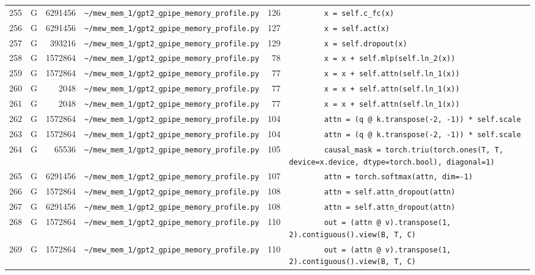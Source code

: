\documentclass{article}
\begin{document}
\begin{longtable}{r l r p{6.5cm} r p{7.0cm}}
255 & G & 6291456 & \lstinline|~/mew_mem_1/gpt2_gpipe_memory_profile.py| & 126 & \lstinline|        x = self.c_fc(x)| \\
256 & G & 6291456 & \lstinline|~/mew_mem_1/gpt2_gpipe_memory_profile.py| & 127 & \lstinline|        x = self.act(x)| \\
257 & G & 393216 & \lstinline|~/mew_mem_1/gpt2_gpipe_memory_profile.py| & 129 & \lstinline|        x = self.dropout(x)| \\
258 & G & 1572864 & \lstinline|~/mew_mem_1/gpt2_gpipe_memory_profile.py| & 78 & \lstinline|        x = x + self.mlp(self.ln_2(x))| \\
259 & G & 1572864 & \lstinline|~/mew_mem_1/gpt2_gpipe_memory_profile.py| & 77 & \lstinline|        x = x + self.attn(self.ln_1(x))| \\
260 & G & 2048 & \lstinline|~/mew_mem_1/gpt2_gpipe_memory_profile.py| & 77 & \lstinline|        x = x + self.attn(self.ln_1(x))| \\
261 & G & 2048 & \lstinline|~/mew_mem_1/gpt2_gpipe_memory_profile.py| & 77 & \lstinline|        x = x + self.attn(self.ln_1(x))| \\
262 & G & 1572864 & \lstinline|~/mew_mem_1/gpt2_gpipe_memory_profile.py| & 104 & \lstinline|        attn = (q @ k.transpose(-2, -1)) * self.scale| \\
263 & G & 1572864 & \lstinline|~/mew_mem_1/gpt2_gpipe_memory_profile.py| & 104 & \lstinline|        attn = (q @ k.transpose(-2, -1)) * self.scale| \\
264 & G & 65536 & \lstinline|~/mew_mem_1/gpt2_gpipe_memory_profile.py| & 105 & \lstinline|        causal_mask = torch.triu(torch.ones(T, T, device=x.device, dtype=torch.bool), diagonal=1)| \\
265 & G & 6291456 & \lstinline|~/mew_mem_1/gpt2_gpipe_memory_profile.py| & 107 & \lstinline|        attn = torch.softmax(attn, dim=-1)| \\
266 & G & 1572864 & \lstinline|~/mew_mem_1/gpt2_gpipe_memory_profile.py| & 108 & \lstinline|        attn = self.attn_dropout(attn)| \\
267 & G & 6291456 & \lstinline|~/mew_mem_1/gpt2_gpipe_memory_profile.py| & 108 & \lstinline|        attn = self.attn_dropout(attn)| \\
268 & G & 1572864 & \lstinline|~/mew_mem_1/gpt2_gpipe_memory_profile.py| & 110 & \lstinline|        out = (attn @ v).transpose(1, 2).contiguous().view(B, T, C)| \\
269 & G & 1572864 & \lstinline|~/mew_mem_1/gpt2_gpipe_memory_profile.py| & 110 & \lstinline|        out = (attn @ v).transpose(1, 2).contiguous().view(B, T, C)| \\

\end{longtable}
\end{document}
